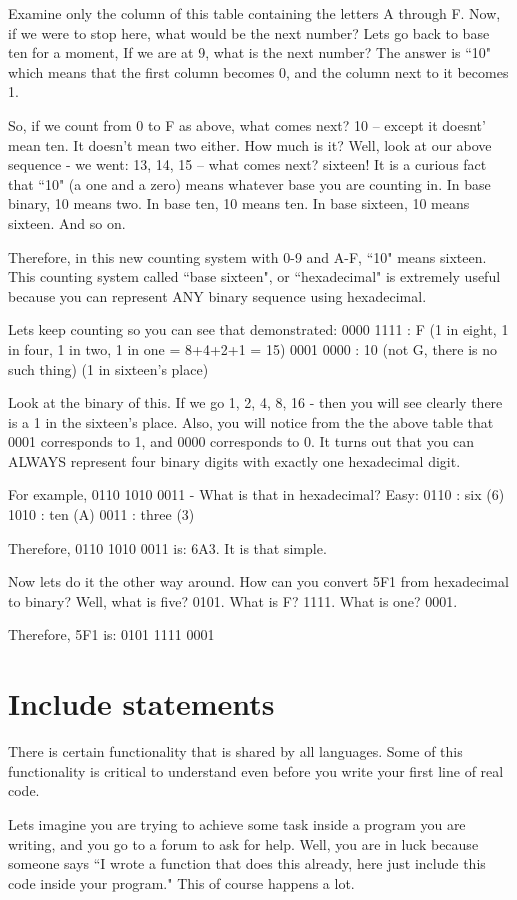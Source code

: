 \documentclass[a4paper,12pt]{article}
\let\stdsection\section
\renewcommand\section{\newpage\stdsection}
\begin{document}
Examine only the column of this table containing the letters A through F. Now, if we were to stop here, what would be the next number? Lets go back to base ten for a moment, If we are at 9, what is the next number? The answer is ``10" which means that the first column becomes 0, and the column next to it becomes 1.

So, if we count from 0 to F as above, what comes next? 10 -- except it doesnt' mean ten. It doesn't mean two either. How much is it? Well, look at our above sequence - we went: 13, 14, 15 -- what comes next? sixteen! It is a curious fact that ``10" (a one and a zero) means whatever base you are counting in. In base binary, 10 means two. In base ten, 10 means ten. In base sixteen, 10 means sixteen. And so on.

Therefore, in this new counting system with 0-9 and A-F, ``10" means sixteen. This counting system called ``base sixteen", or ``hexadecimal" is extremely useful because you can represent ANY binary sequence using hexadecimal.

Lets keep counting so you can see that demonstrated:
0000 1111 : F (1 in eight, 1 in four, 1 in two, 1 in one = 8+4+2+1 = 15)
0001 0000 : 10 (not G, there is no such thing) (1 in sixteen's place)

Look at the binary of this. If we go 1, 2, 4, 8, 16 - then you will see clearly there is a 1 in the sixteen's place. Also, you will notice from the the above table that 0001 corresponds to 1, and 0000 corresponds to 0. It turns out that you can ALWAYS represent four binary digits with exactly one hexadecimal digit.

For example, 0110 1010 0011 - What is that in hexadecimal? Easy:
0110 : six (6)
1010 : ten (A)
0011 : three (3)

Therefore, 0110 1010 0011 is: 6A3. It is that simple.

Now lets do it the other way around. How can you convert 5F1 from hexadecimal to binary? Well, what is five? 0101. What is F? 1111. What is one? 0001.

Therefore, 5F1 is: 0101 1111 0001
\section{Include statements}
There is certain functionality that is shared by all languages. Some of this functionality is critical to understand even before you write your first line of real code.

Lets imagine you are trying to achieve some task inside a program you are writing, and you go to a forum to ask for help. Well, you are in luck because someone says ``I wrote a function that does this already, here just include this code inside your program." This of course happens a lot.
\end{document}

